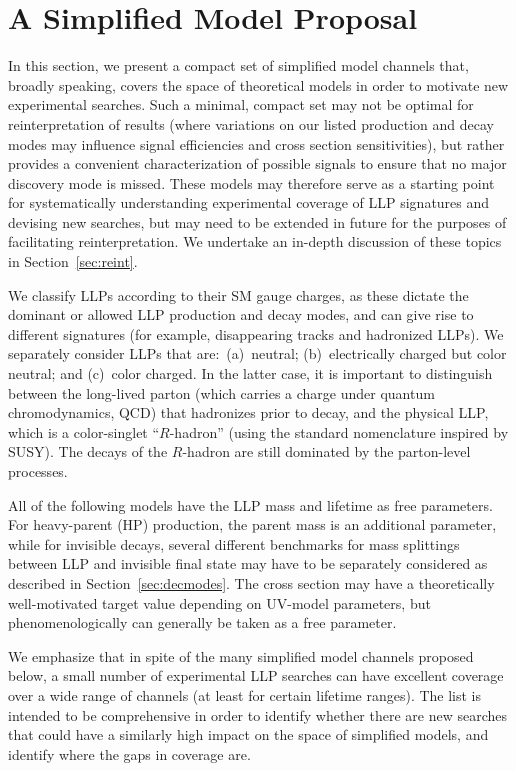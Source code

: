 \section{A Simplified Model Proposal}\label{sec:proposal}

In this section, we present a compact set of simplified model channels that, broadly speaking, covers the space of theoretical models in order to motivate new experimental searches.
Such a minimal, compact set may not be optimal for reinterpretation of results (where variations on our listed production and decay modes may influence signal efficiencies and cross section sensitivities), but rather provides a convenient characterization of possible signals to ensure that no major discovery mode is missed.
These models may therefore serve as a starting point for systematically understanding experimental coverage of LLP signatures and devising new searches, but may need to be extended in future for the purposes of facilitating reinterpretation.
We undertake an in-depth discussion of these topics in Section~\ref{sec:reint}.

We classify LLPs according to their SM gauge charges, as these dictate the dominant or allowed LLP production and decay modes, and can give rise to different signatures (for example, disappearing tracks and hadronized LLPs).
We separately consider LLPs that are:~(a)~neutral; (b)~electrically charged but color neutral; and (c)~color charged.
In the latter case, it is important to distinguish between the long-lived parton (which carries a charge under quantum chromodynamics, QCD) that hadronizes prior to decay, and the physical LLP, which is a color-singlet ``$R$-hadron'' (using the standard nomenclature inspired by SUSY).
The decays of the $R$-hadron are still dominated by the parton-level processes.

All of the following models have the LLP mass and lifetime as free parameters.
For heavy-parent (HP) production, the parent mass is an additional parameter, while for invisible decays, several different benchmarks for mass splittings between LLP and invisible final state may have to be separately considered as described in Section~\ref{sec:decmodes}.
The cross section may have a theoretically well-motivated target value depending on UV-model parameters, but phenomenologically can generally be taken as a free parameter.

We emphasize that in spite of the many simplified model channels proposed below, a small number of experimental LLP searches can have excellent coverage over a wide range of channels (at least for certain lifetime ranges).
The list is intended to be comprehensive in order to identify whether there are new searches that could have a similarly high impact on the space of simplified models, and identify where the gaps in coverage are.

